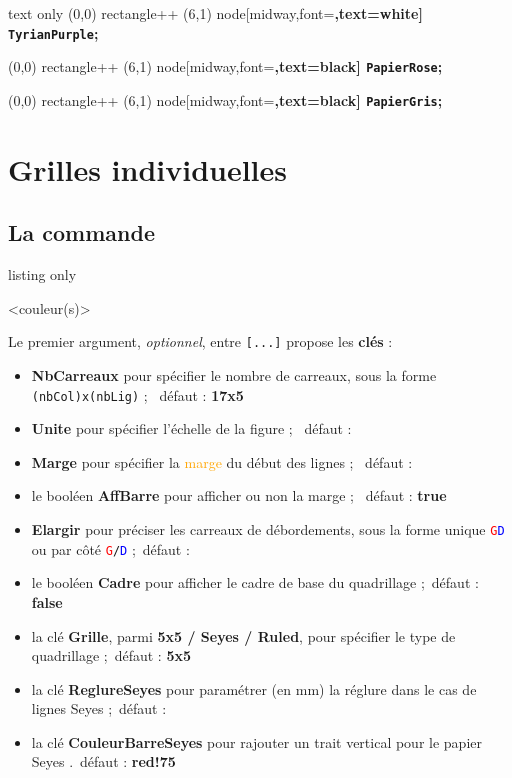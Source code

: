 \documentclass[a4paper]{article}
\newcommand\Cle[1]{{\bfseries\sffamily\textlangle #1\textrangle}}
\begin{document}
\begin{PresentationCode}{text only}
{\tikz \filldraw[TyrianPurple] (0,0) rectangle++ (6,1) node[midway,font=\bfseries\large,text=white] {\verb+TyrianPurple+};}

{\tikz \filldraw[PapierRose] (0,0) rectangle++ (6,1) node[midway,font=\bfseries\large,text=black] {\verb+PapierRose+};}

{\tikz \filldraw[PapierGris] (0,0) rectangle++ (6,1) node[midway,font=\bfseries\large,text=black] {\verb+PapierGris+};}
\end{PresentationCode}



\pagebreak

\section{Grilles individuelles}

\subsection{La commande}

\begin{PresentationCode}{listing only}

\AffQuadrillage[clés]<couleur(s)>
\end{PresentationCode}

Le premier argument, \textit{optionnel}, entre \texttt{[...]} propose les \Cle{clés} :

\begin{itemize}
	\item \Cle{NbCarreaux} pour spécifier le nombre de carreaux, sous la forme \texttt{(nbCol)x(nbLig)} ; \hfill~défaut : \Cle{17x5}
	\item \Cle{Unite} pour spécifier l'échelle de la figure ; \hfill~défaut : \Cle{1}
	\item \Cle{Marge} pour spécifier la \textcolor{orange}{marge} du début des lignes ; \hfill~défaut : \Cle{0}
	\item le booléen \Cle{AffBarre} pour afficher ou non la marge ; \hfill~défaut : \Cle{true}
	\item \Cle{Elargir} pour préciser les carreaux de débordements, sous la forme unique \texttt{\textcolor{red}{G}\textcolor{blue}{D}} ou par côté \texttt{\textcolor{red}{G}/\textcolor{blue}{D}} ;\hfill~défaut : \Cle{0}
	\item le booléen \Cle{Cadre} pour afficher le cadre de base du quadrillage ;\hfill~défaut : \Cle{false}
	\item la clé \Cle{Grille}, parmi \Cle{5x5 / Seyes / Ruled}, pour spécifier le type de quadrillage ;\hfill~défaut : \Cle{5x5}
	\item la clé \Cle{ReglureSeyes} pour paramétrer (en mm) la réglure dans le cas de lignes Seyes ;\hfill~défaut : \Cle{2}
	\item la clé \Cle{CouleurBarreSeyes} pour rajouter un trait vertical pour le papier Seyes .\hfill~défaut : \Cle{red!75}
\end{itemize}
\end{document}
